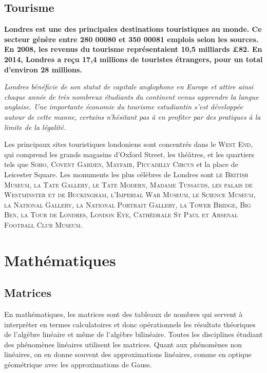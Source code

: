 \documentclass{article}
\begin{document}
\subsection{Tourisme}

\textbf{Londres est une des principales destinations touristiques au monde. Ce secteur génère entre 280 00080 et 350 00081 emplois selon les sources. En 2008, les revenus du tourisme représentaient 10,5 milliards £82. En 2014, Londres a reçu 17,4 millions de touristes étrangers, pour un total d'environ 28 millions.}

\textit{Londres bénéficie de son statut de capitale anglophone en Europe et attire ainsi chaque année de très nombreux étudiants du continent venus apprendre la langue anglaise. Une importante économie du tourisme estudiantin s'est développée autour de cette manne, certains n'hésitant pas à en profiter par des pratiques à la limite de la légalité.}

Les principaux sites touristiques londoniens sont concentrés dans le \textsc{West End}, qui comprend les grands magasins d’Oxford Street, les théâtres, et les quartiers tels que \textsc{Soho, Covent Garden, Mayfair, Piccadilly Circus} et la place de Leicester Square. Les monuments les plus célèbres de Londres sont \textsc{le British Museum, la Tate Gallery, le Tate Modern, Madame Tussauds, les palais de Westminster et de Buckingham, l’Imperial War Museum, le Science Museum, la National Gallery, la National Portrait Gallery, la Tower Bridge, Big Ben, la Tour de Londres, London Eye, Cathédrale St Paul et Arsenal Football Club Museum}.

\newpage

\section{Mathématiques}

\subsection{Matrices}



En mathématiques, les matrices sont des tableaux de nombres qui servent à interpréter en termes calculatoires et donc opérationnels les résultats théoriques de l'algèbre linéaire et même de l'algèbre bilinéaire. 
Toutes les disciplines étudiant des phénomènes linéaires utilisent les matrices. Quant aux phénomènes non linéaires, on en donne souvent des approximations linéaires, comme en optique géométrique avec les approximations de Gauss.
\end{document}
